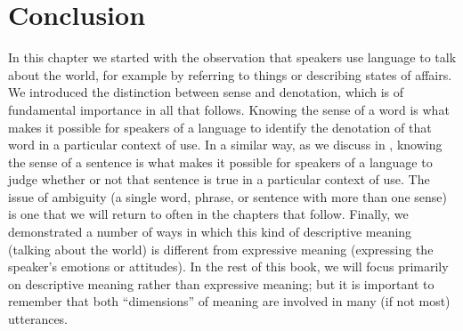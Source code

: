 

\section{Conclusion}\label{sec:2.7}

In this chapter we started with the observation that speakers use language to talk about the world, for example by referring to things or describing states of affairs. We introduced the distinction between sense and denotation, which is of fundamental importance in all that follows. Knowing the sense of a word is what makes it possible for speakers of a language to identify the denotation of that word in a particular context of use. In a similar way, as we discuss in , knowing the sense of a sentence is what makes it possible for speakers of a language to judge whether or not that sentence is true in a particular context of use. The issue of ambiguity (a single word, phrase, or sentence with more than one sense) is one that we will return to often in the chapters that follow. Finally, we demonstrated a number of ways in which this kind of descriptive meaning (talking about the world) is different from expressive meaning (expressing the speaker’s emotions or attitudes). In the rest of this book, we will focus primarily on descriptive meaning rather than expressive meaning; but it is important to remember that both “dimensions” of meaning are involved in many (if not most) utterances.\clearpage



